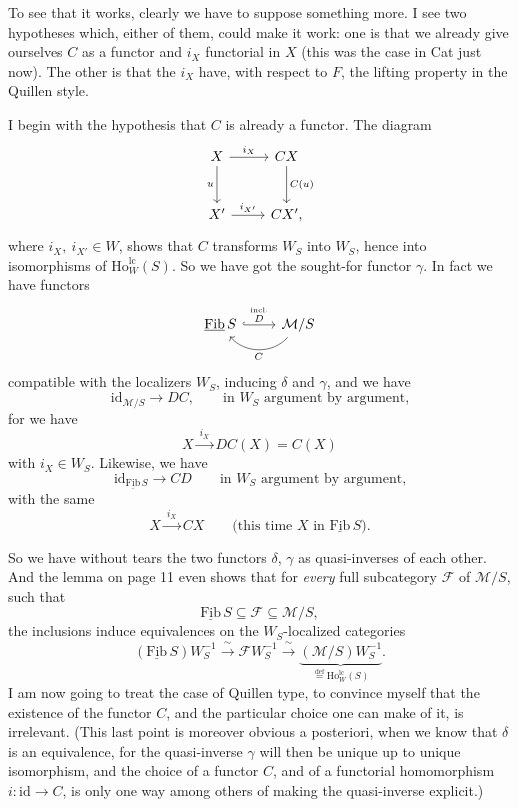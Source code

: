 \documentclass[11pt]{article}
\newcommand{\printedpage}[1]{\marginpar{\footnotesize p.~#1}}
\newcommand{\msp}[1]{\marginpar{\footnotesize [#1]}}
\newcommand{\cM}{\mathcal{M}}
\newcommand{\cF}{\mathcal{F}}
\newcommand{\Fib}{\underline{\mathrm{Fib}}\,}
\newcommand{\Ho}{\mathrm{Ho}}
\begin{document}
To see that it works, clearly we have to suppose something more. I see two
hypotheses which, either of them, could make it work: one is that we already give ourselves
$C$ as a functor and $i_X$ functorial in $X$ (this was the case in Cat just now).
The other is that
\msp{page 88}the $i_X$ have, with respect to $F$, the lifting property in the Quillen style. %

I begin with the hypothesis that $C$ is already a functor. The diagram
\[
\begin{tikzcd}[row sep=large]
X \arrow[r, "i_X"] \arrow[d, "u"'] & CX \arrow[d, "C(u)"] \\
X' \arrow[r, "i_{X'}"] & CX',
\end{tikzcd}
\]
where $i_X,\ i_{X'}\in W$, shows that $C$ transforms $W_S$ into $W_S$, hence into isomorphisms of
$\Ho^{\mathrm{lc}}_W(S)$. So we have got the sought-for functor $\gamma$. In fact we have functors
\[
\begin{tikzcd}
\Fib S \arrow[r, hook, "\overset{\text{incl.}}{D}"] & \cM/S \arrow[l, bend left=50, "C"]
\end{tikzcd}
\]
compatible with the localizers $W_S$, inducing $\delta$ and $\gamma$, and we have
\[
\mathrm{id}_{\cM/S}\longrightarrow DC, \qquad \text{in $W_S$ argument by argument,}
\]
for we have
\[
X\xrightarrow{\ i_X\ }DC(X)=C(X)
\]
with $i_X\in W_S$. Likewise, we have
\[
\mathrm{id}_{\Fib S}\longrightarrow CD \qquad \text{in $W_S$ argument by argument,}
\]
\printedpage{56}
with the same
\[
X\xrightarrow{\ i_X\ }CX \qquad \text{(this time $X$ in $\Fib S$).}
\]

\msp{page 89}So we have without tears the two functors $\delta$, $\gamma$ as quasi-inverses of each other. And the
lemma on page 11 even shows that for \textit{every} full subcategory $\cF$ of $\cM/S$, such that
\[
\Fib S\subseteq\cF\subseteq\cM/S,
\]
the inclusions induce equivalences on the $W_S$-localized categories
\[
(\Fib S)W_S^{-1}\xrightarrow{\ \sim\ }\cF W_S^{-1}\xrightarrow{\ \sim\ }\underbrace{(\cM/S)W_S^{-1}}_{\overset{\text{def}}{=}\Ho^{\mathrm{lc}}_W(S)}.
\]
I am now going to treat the case of Quillen type, to convince myself that the existence of the
functor $C$, and the particular choice one can make of it, is irrelevant. (This last point
is moreover obvious a posteriori, when we know that $\delta$ is an equivalence, for the quasi-inverse
$\gamma$ will then be unique up to unique isomorphism, and the choice of a functor $C$, and
of a functorial homomorphism $i:\mathrm{id}\longrightarrow C$, is only one way among others of making
the quasi-inverse explicit.)
\end{document}
